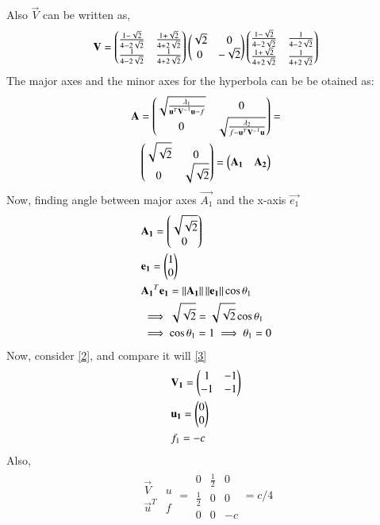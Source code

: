 \documentclass[journal,12pt,twocolumn]{IEEEtran}
\begin{document}
Also $\vec{V}$ can be written as,
\begin{align}
	\mathbf{V} = \begin{pmatrix}\frac{1-\sqrt{2}}{4-2\sqrt{2}} & \frac{1+\sqrt{2}}{4+2\sqrt{2}} \\ \frac{1}{4-2\sqrt{2}} & \frac{1}{4+2\sqrt{2}}\end{pmatrix} \begin{pmatrix}\sqrt{2} &0 \\ 0 & -\sqrt{2}\end{pmatrix} \begin{pmatrix}\frac{1-\sqrt{2}}{4-2\sqrt{2}} & \frac{1}{4-2\sqrt{2}}  \\ \frac{1+\sqrt{2}}{4+2\sqrt{2}} & \frac{1}{4+2\sqrt{2}}\end{pmatrix}
\end{align}
The major axes and the minor axes for the hyperbola can be be otained as:
\begin{multline}
	\mathbf{A} = \begin{pmatrix}\sqrt{\frac{\lambda_1}{\mathbf{u}^T\mathbf{V^-}^1\mathbf{u}-f}} & 0 \\ 0 & \sqrt{\frac{\lambda_2}{f-\mathbf{u}^T\mathbf{V^-}^1\mathbf{u}}} \end{pmatrix} = \\ \begin{pmatrix}\sqrt{\sqrt{2}} & 0 \\ 0 & \sqrt{\sqrt{2}}\end{pmatrix} = \begin{pmatrix}\mathbf{A_1} & \mathbf{A_2}\end{pmatrix}
\end{multline}
Now, finding angle between major axes $\vec{A_1}$ and the x-axis $\vec{e_1}$
\begin{align}
	& \mathbf{A_1} = \begin{pmatrix}\sqrt{\sqrt{2}} \\ 0\end{pmatrix}  \\
	& \mathbf{e_1} = \begin{pmatrix}1 \\ 0\end{pmatrix} \\
	& \mathbf{A_1}^T\mathbf{e_1} = \left\lVert\mathbf{A_1}\right\rVert\left\lVert\mathbf{e_1}\right\rVert\cos\theta_1 \\
	& \implies \sqrt{\sqrt{2}} = \sqrt{\sqrt{2}} \cos\theta_1 \\
	& \implies \cos\theta_1 = 1 \implies \theta_1 = 0 \label{4}
\end{align}
Now, consider \eqref{2}, and compare it will \eqref{3}
\begin{align}
	& \mathbf{V_1} = \begin{pmatrix}1 & -1 \\ -1 & -1\end{pmatrix} \\ 
	& \mathbf{u_1} = \begin{pmatrix}0 \\0\end{pmatrix}\\
	& f_1 = -c
\end{align}
Also,
\begin{align}
	\begin{array}{|cc|}
		\vec{V} & u\\ \vec{u}^T & f
	\end{array} = \begin{array}{|ccc|}
		0 & \frac{1}{2} & 0 \\  \frac{1}{2} & 0  &  0 \\ 0 & 0&-c
	\end{array}  = c/4 \label{5}
\end{align}
\end{document}
